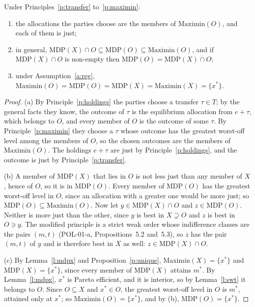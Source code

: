 \documentclass{situationist-preprint}
\begin{document}
\begin{theorem}[Equivalence]\label{t:equiv}
Under Principles~\ref{p:transfer} to~\ref{p:maximin}:
\begin{enumerate}[label=(\alph*)]
\item the allocations the parties choose are the members of $\mathrm{Maximin}(O)$, and each of them is just;
\item in general, $\mathrm{MDP}(X) \cap O \subseteq \mathrm{MDP}(O) \subseteq \mathrm{Maximin}(O)$, and if $\mathrm{MDP}(X) \cap O$ is non-empty then $\mathrm{MDP}(O) = \mathrm{MDP}(X) \cap O$;
\item under Assumption~\ref{a:reg}, $\mathrm{Maximin}(O) = \mathrm{MDP}(O) = \mathrm{MDP}(X) = \mathrm{Maximin}(X) = \{x^*\}$.
\end{enumerate}
\end{theorem}

\begin{proof}
(a) By Principle~\ref{p:holdings} the parties choose a transfer $\tau \in T$; by the general facts they know, the outcome of $\tau$ is the equilibrium allocation from $e + \tau$, which belongs to $O$, and every member of $O$ is the outcome of some $\tau$. By Principle~\ref{p:maximin} they choose a $\tau$ whose outcome has the greatest worst-off level among the members of $O$, so the chosen outcomes are the members of $\mathrm{Maximin}(O)$. The holdings $e + \tau$ are just by Principle~\ref{p:holdings}, and the outcome is just by Principle~\ref{p:transfer}.

(b) A member of $\mathrm{MDP}(X)$ that lies in $O$ is not less just than any member of $X$, hence of $O$, so it is in $\mathrm{MDP}(O)$. Every member of $\mathrm{MDP}(O)$ has the greatest worst-off level in $O$, since an allocation with a greater one would be more just; so $\mathrm{MDP}(O) \subseteq \mathrm{Maximin}(O)$. Now let $y \in \mathrm{MDP}(X) \cap O$ and $z \in \mathrm{MDP}(O)$. Neither is more just than the other, since $y$ is best in $X \supseteq O$ and $z$ is best in $O \ni y$. The modified principle is a strict weak order whose indifference classes are the pairs $(m, t)$ (POL-01-a, Propositions~5.2 and~5.3), so $z$ has the pair $(m, t)$ of $y$ and is therefore best in $X$ as well: $z \in \mathrm{MDP}(X) \cap O$.

(c) By Lemma~\ref{l:mdpx} and Proposition~\ref{p:unique}, $\mathrm{Maximin}(X) = \{x^*\}$ and $\mathrm{MDP}(X) = \{x^*\}$, since every member of $\mathrm{MDP}(X)$ attains $m^*$. By Lemma~\ref{l:mdpx}, $x^*$ is Pareto efficient, and it is interior, so by Lemma~\ref{l:swt} it belongs to $O$. Since $O \subseteq X$ and $x^* \in O$, the greatest worst-off level in $O$ is $m^*$, attained only at $x^*$; so $\mathrm{Maximin}(O) = \{x^*\}$, and by (b), $\mathrm{MDP}(O) = \{x^*\}$.
\end{proof}
\end{document}
